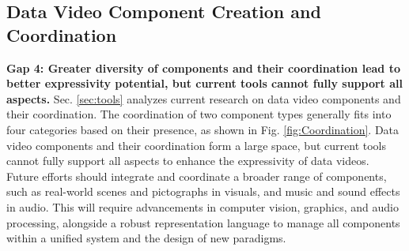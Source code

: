 \subsection{Data Video Component Creation and Coordination}
\textbf{Gap 4: Greater diversity of components and their coordination lead to better expressivity potential, but current tools cannot fully support all aspects.}
Sec. \ref{sec:tools} analyzes current research on data video components and their coordination. The coordination of two component types generally fits into four categories based on their presence, as shown in Fig. \ref{fig:Coordination}.
Data video components and their coordination form a large space, but current tools cannot fully support all aspects to enhance the expressivity of data videos. 
Future efforts should integrate and coordinate a broader range of components, such as real-world scenes and pictographs in visuals, and music and sound effects in audio. 
This will require advancements in computer vision, graphics, and audio processing, alongside a robust representation language to manage all components within a unified system and the design of new paradigms.


